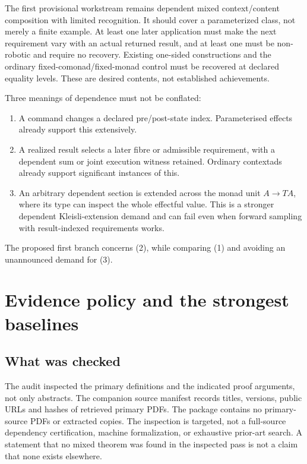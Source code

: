 \documentclass[11pt,a4paper]{article}
\begin{document}
The first provisional workstream remains dependent mixed context/content
composition with limited recognition. It should cover a parameterized class,
not merely a finite example. At least one later application must make the next
requirement vary with an actual returned result, and at least one must be
non-robotic and require no recovery. Existing one-sided constructions and the
ordinary fixed-comonad/fixed-monad control must be recovered at declared equality
levels. These are desired contents, not established achievements.

Three meanings of dependence must not be conflated:
\begin{enumerate}
\item A command changes a declared pre/post-state index. Parameterised effects
already support this extensively.
\item A realized result selects a later fibre or admissible requirement, with a
dependent sum or joint execution witness retained. Ordinary contextads already
support significant instances of this.
\item An arbitrary dependent section is extended across the monad unit
\(A\to TA\), where its type can inspect the whole effectful value. This is a
stronger dependent Kleisli-extension demand and can fail even when forward
sampling with result-indexed requirements works.
\end{enumerate}
The proposed first branch concerns (2), while comparing (1) and avoiding an
unannounced demand for (3).

\section{Evidence policy and the strongest baselines}

\subsection{What was checked}

The audit inspected the primary definitions and the indicated proof arguments,
not only abstracts. The companion source manifest records titles, versions,
public URLs and hashes of retrieved primary PDFs. The package contains no
primary-source PDFs or extracted copies. The inspection is targeted, not a
full-source dependency certification, machine formalization, or exhaustive
prior-art search. A statement that no mixed theorem was found in the inspected
pass is not a claim that none exists elsewhere.
\end{document}
